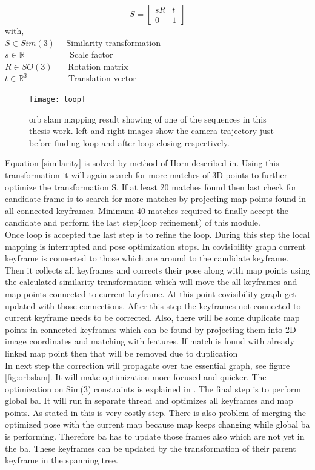 \begin{equation*}
S = 
\begin{bmatrix}
sR & t \\
0 & 1
\end{bmatrix}
\label{similarity}
\end{equation*} 
with,\\
$ S \in Sim(3)$  \ \ Similarity transformation \\
$ s \in \mathbb{R}$ \ \ \ \ \ \ \ \ \ \ Scale factor \\
$ R \in SO(3) $  \ \ \   Rotation matrix \\
$ t \in \mathbb{R^{3}} $ \ \ \ \ \ \ \ \ \ Translation vector
\begin{figure}[H]
	\centering
	\texttt{[image: loop]}
	\caption{\acrshort{orb} \acrshort{slam} mapping result showing of one of the sequences in this thesis work. left and right images show the camera trajectory just before finding loop and after loop closing respectively.}
	\label{fig:loop}
\end{figure}
\noindent Equation \ref{similarity} is solved by method of Horn described in. Using this transformation it will again search for more matches of 3D points to further optimize the transformation S. If at least 20 matches found then last check for candidate frame is to search for more matches by projecting map points found in all connected keyframes. Minimum 40 matches required to finally accept the candidate and perform the last step(loop refinement) of this module. \\
\newline 
Once loop is accepted the last step is to refine the loop. During this step the local mapping is interrupted and pose optimization stops. In covisibility graph current keyframe is connected to those which are around to the candidate keyframe. Then it collects all keyframes and corrects their pose along with map points using the calculated similarity transformation which will move the all keyframes and map points connected to current keyframe. At this point covisibility graph get updated with those connections. After this step the keyframes not connected to current keyframe needs to be corrected. Also, there will be some duplicate map points in connected keyframes which can be found by projecting them into 2D image coordinates and matching with features. If match is found with already linked map point then that will be removed due to duplication \\
\newline 
In next step the correction will propagate over the essential graph, see figure \ref{fig:orbslam}. It will make optimization more focused and quicker. The optimization on Sim(3) constraints is explained in \cite{Mur-Artal}. The final step is to perform global \acrshort{ba}. It will run in separate thread and optimizes all keyframes and map points. As stated in \cite{Mur-Artal} this is very costly step. There is also problem of merging the optimized pose with the current map because map keeps changing while global \acrshort{ba} is performing. Therefore \acrshort{ba} has to update those frames also which are not yet in the \acrshort{ba}. These keyframes can be updated by the transformation of their parent keyframe in the spanning tree.

